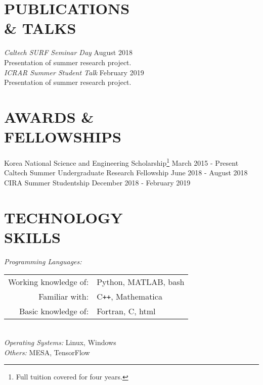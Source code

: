 \documentclass[margin, 10pt]{res} %
\begin{document}
\begin{resume}
\section{PUBLICATIONS \\ \& TALKS}

{\sl Caltech SURF Seminar Day} \hfill{August 2018}\\
Presentation of summer research project. \\
{\sl ICRAR Summer Student Talk} \hfill{February 2019}\\
Presentation of summer research project.


\section{AWARDS \& \\ FELLOWSHIPS}

Korea National Science and Engineering Scholarship\footnote{Full tuition covered for four years.} \hfill March 2015 - Present\\
Caltech Summer Undergraduate Research Fellowship \hfill June 2018 - August 2018\\
CIRA Summer Studentship \hfill December 2018 - February 2019\\



\section{TECHNOLOGY \\ SKILLS} 

{\sl Programming Languages:}\\%
\begin{tabular}{rl}
    Working knowledge of:& Python, MATLAB, bash\\
    Familiar with:& C\texttt{++}, Mathematica\\
     Basic knowledge of:& Fortran, C, html  \\
\end{tabular}\\
{\sl Operating Systems:} Linux, Windows \\
{\sl Others:} MESA, TensorFlow\\
 

\end{resume}
\end{document}
